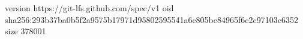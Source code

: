 version https://git-lfs.github.com/spec/v1
oid sha256:293b37ba0b5f2a9575b17971d95802595541a6c805be84965f6c2c97103c6352
size 378001
